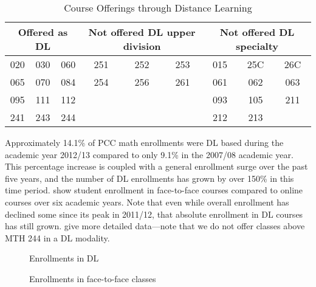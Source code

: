 \begin{table}
	\caption{Course Offerings through Distance Learning}\label{tab:sec3:DLofferings}
	\centering
	\begin{tabular}{ccccccccc}
		\toprule
		\multicolumn{3}{p{1in}}{Offered as DL} & \multicolumn{3}{p{1in}}{Not offered  DL upper division} & \multicolumn{3}{p{1in}}{Not offered  DL specialty} \\
		\midrule
		020 & 030 & 060                        & 251 & 252 & 253                                         & 015 & 25C & 26C                                    \\
		065 & 070 & 084                        & 254 & 256 & 261                                         & 061 & 062 & 063                                    \\
		095 & 111 & 112                        &     &     &                                             & 093 & 105 & 211                                    \\
		241 & 243 & 244                        &     &     &                                             & 212 & 213                                          \\
		\bottomrule
	\end{tabular}
\end{table}

Approximately 14.1\% of PCC math enrollments were DL based during the academic year 2012/13 compared to only 9.1\% in the 2007/08 academic year.
This percentage increase is coupled with a general enrollment surge over the past five years, and the number of DL enrollments has grown by over 150\% in this time period.
 show student enrollment in face-to-face courses compared to online courses over six academic years.
Note that even while overall enrollment has declined some since its peak in 2011/12, that absolute enrollment in DL courses has still grown.
 give more detailed data---note that we do not offer classes above MTH 244 in a DL modality.

\begin{figure}[!htb]
	\begin{minipage}[t]{.5\textwidth}
		
		\caption{Enrollments in DL}\label{fig:sec3:DLenrollments}
	\end{minipage}
	\begin{minipage}[t]{.5\textwidth}
		
		\caption{Enrollments in face-to-face classes}\label{fig:sec3:F2Fenrollments}
	\end{minipage}
\end{figure}

